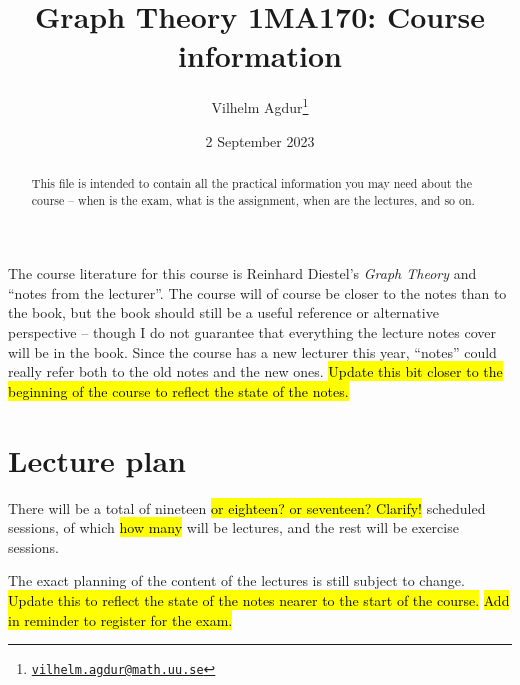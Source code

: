 \documentclass{tufte-handout}
\title{Graph Theory 1MA170: Course information}
\author[Vilhelm Agdur]{Vilhelm Agdur\thanks{\href{mailto:vilhelm.agdur@math.uu.se}{\nolinkurl{vilhelm.agdur@math.uu.se}}}}
\date{2 September 2023}
\begin{document}
\maketitle%

\begin{abstract}
\noindent
This file is intended to contain all the practical information you may need about the course -- when is the exam, what is the assignment, when are the lectures, and so on.
\end{abstract}

The course literature for this course is Reinhard Diestel's \emph{Graph Theory} and ``notes from the lecturer''. The course will of course be closer to the notes than to the book, but the book should still be a useful reference or alternative perspective -- though I do not guarantee that everything the lecture notes cover will be in the book. Since the course has a new lecturer this year, ``notes'' could really refer both to the old notes and the new ones. \hl{Update this bit closer to the beginning of the course to reflect the state of the notes.}

\section{Lecture plan}

There will be a total of nineteen \hl{or eighteen? or seventeen? Clarify!} scheduled sessions, of which \hl{how many} will be lectures, and the rest will be exercise sessions.

The exact planning of the content of the lectures is still subject to change. \hl{Update this to reflect the state of the notes nearer to the start of the course.} \hl{Add in reminder to register for the exam.}
\end{document}

